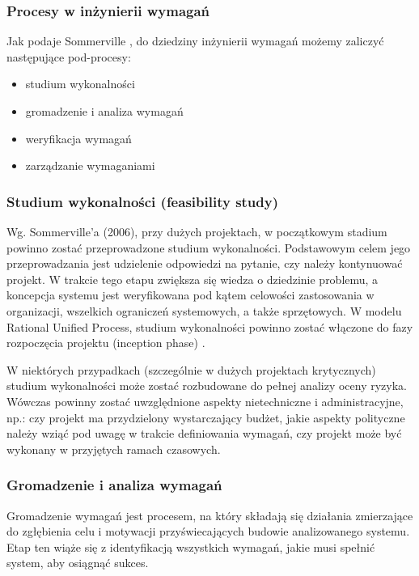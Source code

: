       \subsubsection{Procesy w inżynierii wymagań}

      Jak podaje Sommerville \cite{Somm06}, do dziedziny inżynierii wymagań możemy zaliczyć następujące pod-procesy:

      \begin{itemize} 
          \item studium wykonalności 
          \item gromadzenie i analiza wymagań
          \item weryfikacja wymagań
          \item zarządzanie wymaganiami
      \end{itemize}

      \subsubsection{Studium wykonalności (feasibility study)}

        Wg. Sommerville'a (2006), przy dużych projektach, w początkowym stadium powinno zostać przeprowadzone studium wykonalności. Podstawowym celem jego przeprowadzania jest udzielenie odpowiedzi na pytanie, czy należy kontynuować projekt. W trakcie tego etapu zwiększa się wiedza o dziedzinie problemu, a koncepcja systemu jest weryfikowana pod kątem celowości zastosowania w organizacji, wszelkich ograniczeń systemowych, a także sprzętowych. W modelu Rational Unified Process, studium wykonalności powinno zostać włączone do fazy rozpoczęcia projektu (inception phase) \cite{Kruch03}.

        W niektórych przypadkach (szczególnie w dużych projektach krytycznych) studium wykonalności może zostać rozbudowane do pełnej analizy oceny ryzyka. Wówczas powinny zostać uwzględnione aspekty nietechniczne i administracyjne, np.: czy projekt ma przydzielony wystarczający budżet, jakie aspekty polityczne należy wziąć pod uwagę w trakcie definiowania wymagań, czy projekt może być wykonany w przyjętych ramach czasowych.

      \subsubsection{Gromadzenie i analiza wymagań}

        Gromadzenie wymagań jest procesem, na który składają się działania zmierzające do zgłębienia celu i motywacji przyświecających budowie analizowanego systemu. Etap ten wiąże się z identyfikacją wszystkich wymagań, jakie musi spełnić system, aby osiągnąć sukces.
        
